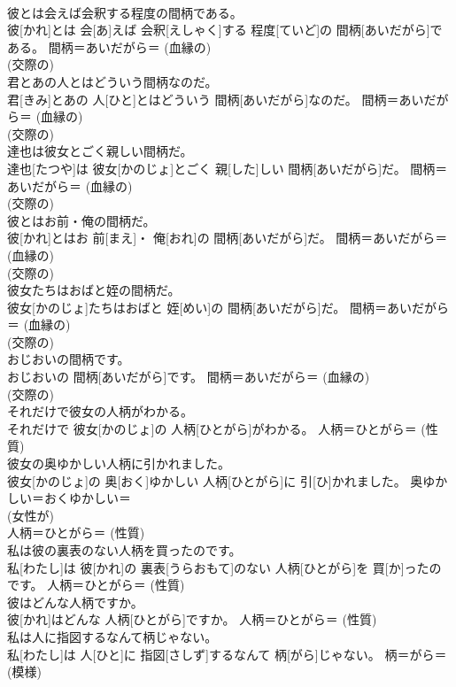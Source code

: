 \documentclass[8pt]{extreport}
\begin{document}
\begin{CJK}{UTF8}{min}
{\\	彼とは会えば会釈する程度の間柄である。	
\\	彼[かれ]とは 会[あ]えば 会釈[えしゃく]する 程度[ていど]の 間柄[あいだがら]である。	間柄＝あいだがら＝ (血縁の) 
\\	(交際の) 
\\	君とあの人とはどういう間柄なのだ。	
\\	君[きみ]とあの 人[ひと]とはどういう 間柄[あいだがら]なのだ。	間柄＝あいだがら＝ (血縁の) 
\\	(交際の) 
\\	達也は彼女とごく親しい間柄だ。	
\\	達也[たつや]は 彼女[かのじょ]とごく 親[した]しい 間柄[あいだがら]だ。	間柄＝あいだがら＝ (血縁の) 
\\	(交際の) 
\\	彼とはお前・俺の間柄だ。	
\\	彼[かれ]とはお 前[まえ]・ 俺[おれ]の 間柄[あいだがら]だ。	間柄＝あいだがら＝ (血縁の) 
\\	(交際の) 
\\	彼女たちはおばと姪の間柄だ。	
\\	彼女[かのじょ]たちはおばと 姪[めい]の 間柄[あいだがら]だ。	間柄＝あいだがら＝ (血縁の) 
\\	(交際の) 
\\	おじおいの間柄です。	
\\	おじおいの 間柄[あいだがら]です。	間柄＝あいだがら＝ (血縁の) 
\\	(交際の) 
\\	それだけで彼女の人柄がわかる。	
\\	それだけで 彼女[かのじょ]の 人柄[ひとがら]がわかる。	人柄＝ひとがら＝ (性質) 
\\	彼女の奥ゆかしい人柄に引かれました。	
\\	彼女[かのじょ]の 奥[おく]ゆかしい 人柄[ひとがら]に 引[ひ]かれました。	奥ゆかしい＝おくゆかしい＝ 
\\	(女性が) 
\\	人柄＝ひとがら＝ (性質) 
\\	私は彼の裏表のない人柄を買ったのです。	
\\	私[わたし]は 彼[かれ]の 裏表[うらおもて]のない 人柄[ひとがら]を 買[か]ったのです。	人柄＝ひとがら＝ (性質) 
\\	彼はどんな人柄ですか。	
\\	彼[かれ]はどんな 人柄[ひとがら]ですか。	人柄＝ひとがら＝ (性質) 
\\	私は人に指図するなんて柄じゃない。	
\\	私[わたし]は 人[ひと]に 指図[さしず]するなんて 柄[がら]じゃない。	柄＝がら＝ (模様) 
}
\end{CJK}
\end{document}

